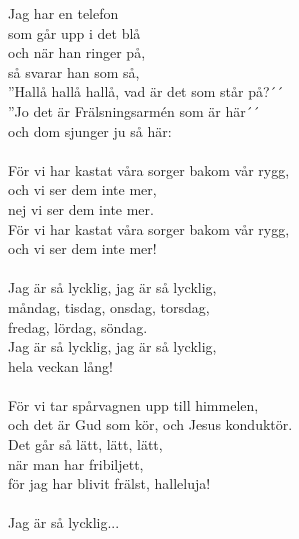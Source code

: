\vspace{10pt}
Jag har en telefon\\
som går upp i det blå\\
och när han ringer på,\\
så svarar han som så,\\
''Hallå hallå hallå, vad är det som står på?´´\\
''Jo det är Frälsningsarmén som är här´´\\
och dom sjunger ju så här:\\
\\
För vi har kastat våra sorger bakom vår rygg,\\
och vi ser dem inte mer,\\
nej vi ser dem inte mer.\\
För vi har kastat våra sorger bakom vår rygg,\\
och vi ser dem inte mer!\\
\\
Jag är så lycklig, jag är så lycklig,\\
måndag, tisdag, onsdag, torsdag,\\
fredag, lördag, söndag.\\
Jag är så lycklig, jag är så lycklig,\\
hela veckan lång!\\
\\
För vi tar spårvagnen upp till himmelen,\\
och det är Gud som kör, och Jesus konduktör.\\
Det går så lätt, lätt, lätt,\\
när man har fribiljett,\\
för jag har blivit frälst, halleluja!\\
\\
Jag är så lycklig...
